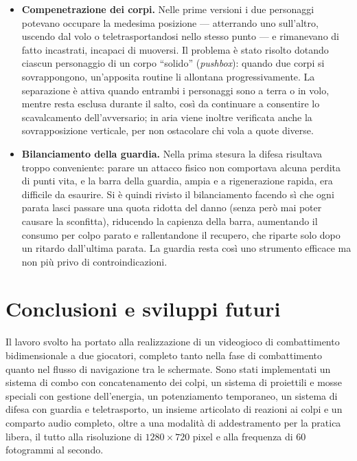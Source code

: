 \documentclass[12pt,a4paper]{report}
\begin{document}
\begin{itemize}
  \item \textbf{Compenetrazione dei corpi.} Nelle prime versioni i due personaggi potevano occupare la medesima posizione --- atterrando uno sull'altro, uscendo dal volo o teletrasportandosi nello stesso punto --- e rimanevano di fatto incastrati, incapaci di muoversi. Il problema è stato risolto dotando ciascun personaggio di un corpo ``solido'' (\emph{pushbox}): quando due corpi si sovrappongono, un'apposita routine li allontana progressivamente. La separazione è attiva quando entrambi i personaggi sono a terra o in volo, mentre resta esclusa durante il salto, così da continuare a consentire lo scavalcamento dell'avversario; in aria viene inoltre verificata anche la sovrapposizione verticale, per non ostacolare chi vola a quote diverse.

  \item \textbf{Bilanciamento della guardia.} Nella prima stesura la difesa risultava troppo conveniente: parare un attacco fisico non comportava alcuna perdita di punti vita, e la barra della guardia, ampia e a rigenerazione rapida, era difficile da esaurire. Si è quindi rivisto il bilanciamento facendo sì che ogni parata lasci passare una quota ridotta del danno (senza però mai poter causare la sconfitta), riducendo la capienza della barra, aumentando il consumo per colpo parato e rallentandone il recupero, che riparte solo dopo un ritardo dall'ultima parata. La guardia resta così uno strumento efficace ma non più privo di controindicazioni.
\end{itemize}



\chapter{Conclusioni e sviluppi futuri}\label{ch:conc-svil-fut}
Il lavoro svolto ha portato alla realizzazione di un videogioco di combattimento bidimensionale a due giocatori, completo tanto nella fase di combattimento quanto nel flusso di navigazione tra le schermate. Sono stati implementati un sistema di combo con concatenamento dei colpi, un sistema di proiettili e mosse speciali con gestione dell'energia, un potenziamento temporaneo, un sistema di difesa con guardia e teletrasporto, un insieme articolato di reazioni ai colpi e un comparto audio completo, oltre a una modalità di addestramento per la pratica libera, il tutto alla risoluzione di $1280 \times 720$ pixel e alla frequenza di 60 fotogrammi al secondo.
\end{document}
